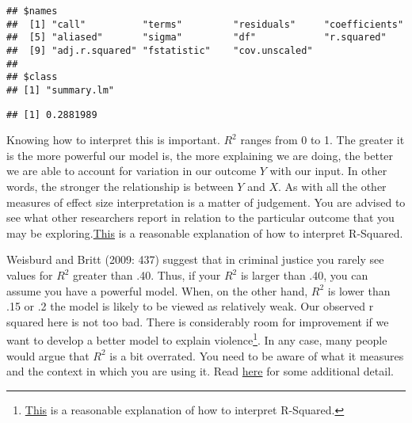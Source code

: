 \documentclass[
]{book}
\newenvironment{Shaded}{\begin{snugshade}}{\end{snugshade}}
\newcommand{\CommentTok}[1]{\textcolor[rgb]{0.56,0.35,0.01}{\textit{#1}}}
\newcommand{\FunctionTok}[1]{\textcolor[rgb]{0.13,0.29,0.53}{\textbf{#1}}}
\newcommand{\NormalTok}[1]{#1}
\newcommand{\SpecialCharTok}[1]{\textcolor[rgb]{0.81,0.36,0.00}{\textbf{#1}}}
\begin{document}
\begin{verbatim}
## $names
##  [1] "call"          "terms"         "residuals"     "coefficients" 
##  [5] "aliased"       "sigma"         "df"            "r.squared"    
##  [9] "adj.r.squared" "fstatistic"    "cov.unscaled" 
## 
## $class
## [1] "summary.lm"
\end{verbatim}

\begin{Shaded}
\end{Shaded}

\begin{verbatim}
## [1] 0.2881989
\end{verbatim}

Knowing how to interpret this is important. \(R^2\) ranges from 0 to 1. The greater it is the more powerful our model is, the more explaining we are doing, the better we are able to account for variation in our outcome \(Y\) with our input. In other words, the stronger the relationship is between \(Y\) and \(X\). As with all the other measures of effect size interpretation is a matter of judgement. You are advised to see what other researchers report in relation to the particular outcome that you may be exploring.\href{http://blog.minitab.com/blog/adventures-in-statistics/regression-analysis-how-do-i-interpret-r-squared-and-assess-the-goodness-of-fit}{This} is a reasonable explanation of how to interpret R-Squared.

Weisburd and Britt (2009: 437) suggest that in criminal justice you rarely see values for \(R^2\) greater than .40. Thus, if your \(R^2\) is larger than .40, you can assume you have a powerful model. When, on the other hand, \(R^2\) is lower than .15 or .2 the model is likely to be viewed as relatively weak. Our observed r squared here is not too bad. There is considerably room for improvement if we want to develop a better model to explain violence\footnote{\href{http://blog.minitab.com/blog/adventures-in-statistics/regression-analysis-how-do-i-interpret-r-squared-and-assess-the-goodness-of-fit}{This} is a reasonable explanation of how to interpret R-Squared.}. In any case, many people would argue that \(R^2\) is a bit overrated. You need to be aware of what it measures and the context in which you are using it. Read \href{http://blog.minitab.com/blog/adventures-in-statistics/how-high-should-r-squared-be-in-regression-analysis}{here} for some additional detail.
\end{document}
